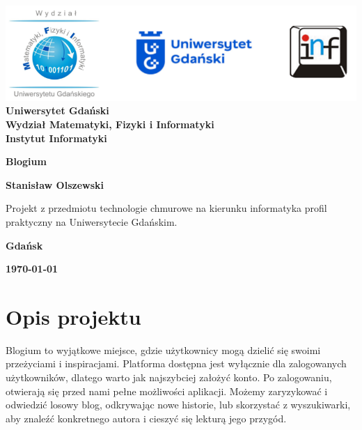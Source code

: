 \documentclass[12pt,a4paper]{article}
\newcommand{\hmwkTitle}{Blogium} %
\newcommand{\hmwkDueDate}{\today} %
\newcommand{\hmwkAuthorName}{Stanisław Olszewski} %
\begin{document}
\begin{titlepage}
    \vfill
	\begin{center}
	\hspace*{-1cm}
	\vspace*{0.5cm}
    \includegraphics[scale=0.55]{loga.png}\\
	\textbf{Uniwersytet Gdański \\ [0.05cm]Wydział Matematyki, Fizyki i Informatyki \\ [0.05cm] Instytut Informatyki}

	\vspace{0.6cm}
	\vspace{4cm}
	{\huge \textbf{\hmwkTitle}}\vspace{8mm}
	
	{\large \textbf{\hmwkAuthorName}}\\[3cm]
	
		\hspace{.45\textwidth} %
	   \begin{minipage}{.5\textwidth}
	   Projekt z przedmiotu technologie chmurowe na kierunku informatyka profil praktyczny na Uniwersytecie Gdańskim.\\[0.1cm]
	  \end{minipage}
	  \vfill
	
	\textbf{Gdańsk}
	
	\textbf{\hmwkDueDate}
	\end{center}
	
\end{titlepage}

\newpage
\setcounter{secnumdepth}{5}
\tableofcontents
\newpage

\section{Opis projektu}
\label{sec:Project}

Blogium to wyjątkowe miejsce, gdzie użytkownicy mogą dzielić się swoimi przeżyciami i inspiracjami. Platforma dostępna jest wyłącznie dla zalogowanych użytkowników, dlatego warto jak najszybciej założyć konto. Po zalogowaniu, otwierają się przed nami pełne możliwości aplikacji. Możemy zaryzykować i odwiedzić losowy blog, odkrywając nowe historie, lub skorzystać z wyszukiwarki, aby znaleźć konkretnego autora i cieszyć się lekturą jego przygód.
\end{document}
